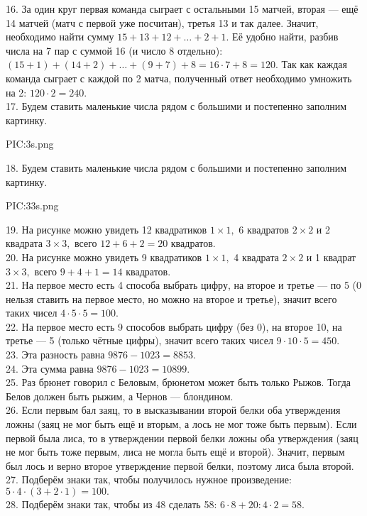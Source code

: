 16. За один круг первая команда сыграет с остальными 15 матчей, вторая --- ещё 14 матчей (матч с первой уже посчитан), третья 13 и так далее. Значит, необходимо найти сумму $15+13+12+\ldots+2+1.$ Её удобно найти, разбив числа на 7 пар с суммой 16 (и число 8 отдельно): $(15+1)+(14+2)+\ldots+(9+7)+8=16\cdot7+8=120.$ Так как каждая команда сыграет с каждой по 2 матча, полученный ответ необходимо умножить на 2: $120\cdot2=240.$\\
17. Будем ставить маленькие числа рядом с большими и постепенно заполним картинку.
\begin{center}
{{PIC:3s.png}}
\end{center}
18. Будем ставить маленькие числа рядом с большими и постепенно заполним картинку.
\begin{center}
{{PIC:33s.png}}
\end{center}
19. На рисунке можно увидеть 12 квадратиков $1\times1,$ 6 квадратов $2\times2$ и 2 квадрата $3\times3,$ всего $12+6+2=20$ квадратов.\\
20. На рисунке можно увидеть 9 квадратиков $1\times1,$ 4 квадрата $2\times2$ и 1 квадрат $3\times3,$ всего $9+4+1=14$ квадратов.\\
21. На первое место есть 4 способа выбрать цифру, на второе и третье --- по 5 (0 нельзя ставить на первое место, но можно на второе и третье), значит всего таких чисел $4\cdot5\cdot5=100.$\\
22. На первое место есть 9 способов выбрать цифру (без 0), на второе 10, на третье --- 5 (только чётные цифры), значит всего таких чисел $9\cdot10\cdot5=450.$\\
23. Эта разность равна $9876-1023=8853.$\\
24. Эта сумма равна $9876-1023=10899.$\\
25. Раз брюнет говорил с Беловым, брюнетом может быть только Рыжов. Тогда Белов должен быть рыжим, а Чернов --- блондином.\\
26. Если первым бал заяц, то в высказывании второй белки оба утверждения ложны (заяц не мог быть ещё и вторым, а лось не мог тоже быть первым). Если первой была лиса, то в утверждении первой белки ложны оба утверждения (заяц не мог быть тоже первым, лиса не могла быть ещё и второй). Значит, первым был лось и верно второе утверждение первой белки, поэтому лиса была второй.\\
27. Подберём знаки так, чтобы получилось нужное произведение: $5\cdot4\cdot(3+2\cdot1) = 100.$\\
28. Подберём знаки так, чтобы из 48 сделать 58: $6\cdot8+20:4\cdot2 = 58.$\\
